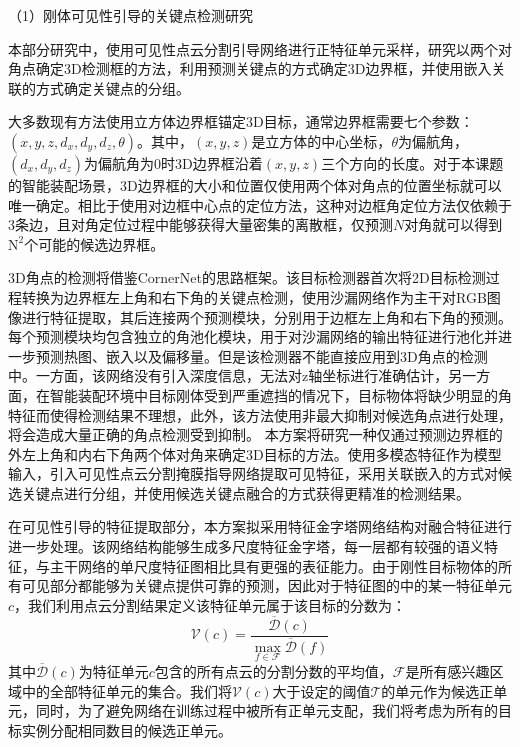 \documentclass[12pt]{article}
\begin{document}
（1）刚体可见性引导的关键点检测研究

本部分研究中，使用可见性点云分割引导网络进行正特征单元采样，研究以两个对角点确定3D检测框的方法，利用预测关键点的方式确定3D边界框，并使用嵌入关联的方式确定关键点的分组。

大多数现有方法使用立方体边界框锚定3D目标，通常边界框需要七个参数：$(x, y, z, d_x, d_y, d_z, \theta)$。其中，$(x,y,z)$是立方体的中心坐标，$\theta$为偏航角，$(d_x, d_y, d_z)$为偏航角为0时3D边界框沿着$(x,y,z)$三个方向的长度。对于本课题的智能装配场景，3D边界框的大小和位置仅使用两个体对角点的位置坐标就可以唯一确定。相比于使用对边框中心点的定位方法，这种对边框角定位方法仅依赖于3条边，且对角定位过程中能够获得大量密集的离散框，仅预测$N$对角就可以得到$\mathrm{N}^2$个可能的候选边界框。


3D角点的检测将借鉴CornerNet的思路框架。该目标检测器首次将2D目标检测过程转换为边界框左上角和右下角的关键点检测，使用沙漏网络作为主干对RGB图像进行特征提取，其后连接两个预测模块，分别用于边框左上角和右下角的预测。每个预测模块均包含独立的角池化模块，用于对沙漏网络的输出特征进行池化并进一步预测热图、嵌入以及偏移量。但是该检测器不能直接应用到3D角点的检测中。一方面，该网络没有引入深度信息，无法对z轴坐标进行准确估计，另一方面，在智能装配环境中目标刚体受到严重遮挡的情况下，目标物体将缺少明显的角特征而使得检测结果不理想，此外，该方法使用非最大抑制对候选角点进行处理，将会造成大量正确的角点检测受到抑制。
本方案将研究一种仅通过预测边界框的外左上角和内右下角两个体对角来确定3D目标的方法。使用多模态特征作为模型输入，引入可见性点云分割掩膜指导网络提取可见特征，采用关联嵌入的方式对候选关键点进行分组，并使用候选关键点融合的方式获得更精准的检测结果。


在可见性引导的特征提取部分，本方案拟采用特征金字塔网络结构对融合特征进行进一步处理。该网络结构能够生成多尺度特征金字塔，每一层都有较强的语义特征，与主干网络的单尺度特征图相比具有更强的表征能力。由于刚性目标物体的所有可见部分都能够为关键点提供可靠的预测，因此对于特征图的中的某一特征单元$c$，我们利用点云分割结果定义该特征单元属于该目标的分数为：
\begin{equation}
\mathcal{V}(c)=\frac{\overline{\mathcal{D}}(c)}{\max _{f \in \mathcal{F}} \overline{\mathcal{D}}(f)}
\label{eq:feature_score}
\end{equation}
其中$\overline{\mathcal{D}}(c)$为特征单元$c$包含的所有点云的分割分数的平均值，$\mathcal{F}$是所有感兴趣区域中的全部特征单元的集合。我们将$\mathcal{V}(c)$大于设定的阈值$\mathcal{T}$的单元作为候选正单元，同时，为了避免网络在训练过程中被所有正单元支配，我们将考虑为所有的目标实例分配相同数目的候选正单元。
\end{document}
